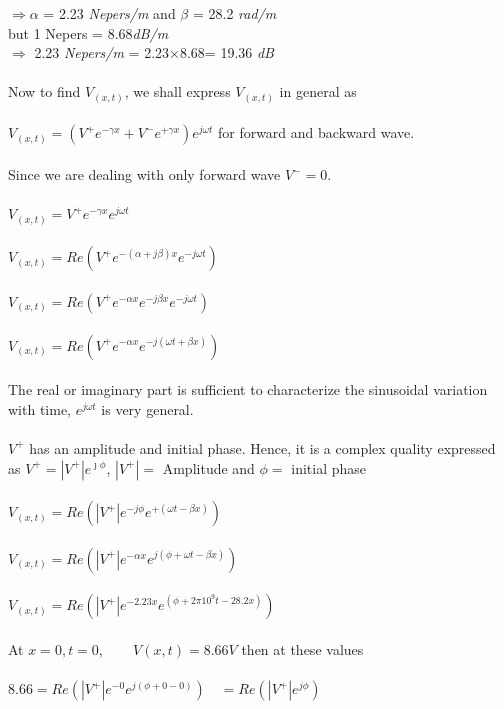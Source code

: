 $\Rightarrow \alpha$ = 2.23 \emph{Nepers/m} and $\beta$ = 28.2 \emph{rad/m}\\
but 1 Nepers = 8.68\emph{dB/m}\\
$\Rightarrow$ 2.23 \emph{Nepers/m} = 2.23$\times$8.68= 19.36 \emph{dB}\\\\
Now to find $V_{(x,t)}$, we shall express $V_{(x,t)}$ in general as \\\\
$V_{(x,t)} = (V^{+}e^{-\gamma x} + V^{-}e^{+\gamma x})e^{j\omega t}$ for forward and backward wave.\\\\
Since we are dealing with only forward wave $ V^{-} = 0 $.\\\\
$V_{(x,t)} = V^{+}e^{-\gamma x}e^{j\omega t}$\\\\
$V_{(x,t)} = Re({V^{+}e^{-(\alpha +j\beta)x}e^{-j\omega t}})$\\\\
$V_{(x,t)} = Re({V^{+}e^{-\alpha x}e^{-j\beta x}e^{-j\omega t}})$\\\\
$V_{(x,t)} = Re({V^{+}e^{-\alpha x}e^{-j(\omega t + \beta x)}})$\\\\The real or imaginary part is sufficient to characterize the sinusoidal variation with time, ${e^{j\omega t}}$ is very general.\\\\
${V^+}$ has an amplitude and initial phase. Hence, it is a complex quality expressed as $ V^{+} = |V^{+}|e^{\jmath\phi} $, $ |V^{+}| =$ Amplitude and $ \phi =$ initial phase\\\\
$V_{(x,t)} = Re({|V^{+}|e^{-j\phi}e^{+(\omega t - \beta x)}})$\\\\
$V_{(x,t)} = Re({|V^{+}|e^{-\alpha x}e^{j(\phi+\omega t - \beta x)}})$\\\\
$V_{(x,t)} = Re({|V^{+}|e^{-2.23x}e^{(\phi+2\pi10^9t-28.2x)}})$\\\\
At $ x = 0, t = 0, \quad \quad V(x,t) = 8.66V $ then at these values\\\\ 
$8.66 = Re({|V^{+}|e^{-0}e^{j(\phi+0-0)}}) \quad = Re({|V^+|}e^{j\phi})$\\\\
